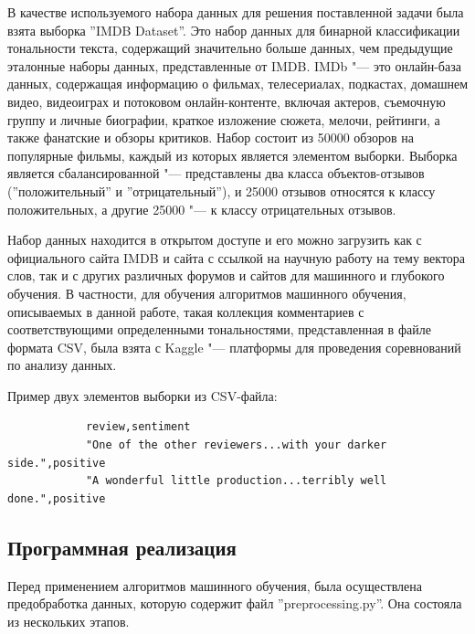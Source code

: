 \documentclass[bachelor, och, coursework]{SCWorks}
\begin{document}
        В качестве используемого набора данных для решения поставленной задачи
        была взята выборка ''IMDB Dataset''. Это набор данных для бинарной
        классификации тональности текста, содержащий значительно больше данных,
        чем предыдущие эталонные наборы данных, представленные от IMDB. IMDb
        "--- это онлайн-база данных, содержащая информацию о фильмах,
        телесериалах, подкастах, домашнем видео, видеоиграх и потоковом
        онлайн-контенте, включая актеров, съемочную группу и личные биографии,
        краткое изложение сюжета, мелочи, рейтинги, а также фанатские и обзоры
        критиков. Набор состоит из 50000 обзоров на популярные фильмы, каждый из
        которых является элементом выборки. Выборка является сбалансированной
        "--- представлены два класса объектов-отзывов (''положительный'' и
        ''отрицательный''), и 25000 отзывов относятся к классу положительных, а
        другие 25000 "--- к классу отрицательных отзывов. 

        Набор данных находится в открытом доступе и его можно загрузить как с
        официального сайта IMDB и сайта с ссылкой на научную работу на тему
        вектора слов, так и с других различных форумов и сайтов для машинного и
        глубокого обучения. В частности, для обучения алгоритмов машинного
        обучения, описываемых в данной работе, такая коллекция комментариев с
        соответствующими определенными тональностями, представленная в файле
        формата CSV, была взята с Kaggle "--- платформы для проведения
        соревнований по анализу данных. \cite{dataset}

        Пример двух элементов выборки из CSV-файла:
        
        \begin{verbatim}
            review,sentiment
            "One of the other reviewers...with your darker side.",positive
            "A wonderful little production...terribly well done.",positive
        \end{verbatim}

    \subsection{Программная реализация}

        Перед применением алгоритмов машинного обучения, была осуществлена
        предобработка данных, которую содержит файл ''preprocessing.py''. Она
        состояла из нескольких этапов.
        
\end{document}
